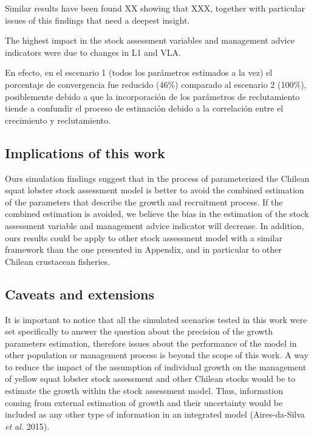\documentclass[11pt,letter,]{article}
\begin{document}
Similar results have been found XX showing that XXX, together with
particular issues of this findings that need a deepest insight.

The highest impact in the stock assessment variables and management
advice indicators were due to changes in L1 and VLA.

En efecto, en el escenario 1 (todos los parámetros estimados a la vez)
el porcentaje de convergencia fue reducido (46\%) comparado al escenario
2 (100\%), posiblemente debido a que la incorporación de los parámetros
de reclutamiento tiende a confundir el proceso de estimación debido a la
correlación entre el crecimiento y reclutamiento.

\subsection{Implications of this work}\label{implications-of-this-work}

Ours simulation findings suggest that in the process of parameterized
the Chilean squat lobster stock assessment model is better to avoid the
combined estimation of the parameters that describe the growth and
recruitment process. If the combined estimation is avoided, we believe
the bias in the estimation of the stock assessment variable and
management advice indicator will decrease. In addition, ours results
could be apply to other stock assessment model with a similar framework
than the one presented in Appendix, and in particular to other Chilean
crustacean fisheries.

\subsection{Caveats and extensions}\label{caveats-and-extensions}

It is important to notice that all the simulated scenarios tested in
this work were set specifically to answer the question about the
precision of the growth parameters estimation, therefore issues about
the performance of the model in other population or management process
is beyond the scope of this work. A way to reduce the impact of the
assumption of individual growth on the management of yellow squat
lobster stock assessment and other Chilean stocks would be to estimate
the growth within the stock assessment model. Thus, information coming
from external estimation of growth and their uncertainty would be
included as any other type of information in an integrated model
(Aires-da-Silva \emph{et al.} 2015).
\end{document}
